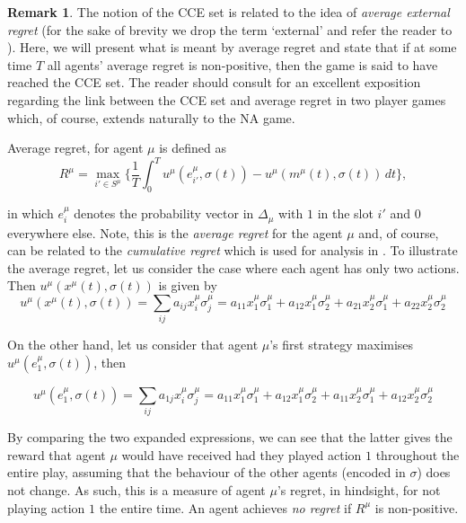 \documentclass{article}
\theoremstyle{definition}
\newtheorem*{remark}{Remark}
\newcommand{\pure}[2]{e^{#1}_{#2}}
\begin{document}
  \begin{remark}
    The notion of the CCE set is related to the idea of \emph{average external regret} (for the
    sake of brevity we drop the term `external' and refer the reader to \cite{Nisan2007}). Here, we
    will present what is meant by average regret and state that if at some time $T$ all agents'
    average regret is non-positive, then the game is said to have reached the CCE set. The
    reader should consult \cite{Ostrovski2014} for an excellent exposition regarding the
    link between the CCE set and average regret in two player games which, of course, extends
    naturally to the NA game.
    
    Average regret, for agent $\mu$ is defined as
%
    \begin{equation}
      R^{\mu} = \max_{i' \in S^\mu} \Big\{ \frac{1}{T} \int_{0}^{T} u^{\mu}(\pure{\mu}{i'}, \sigma(t)) - u^{\mu}(m^\mu(t), \sigma(t)) \, dt \Big\},
    \end{equation}
  
    in which $\pure{\mu}{i}$ denotes the probability vector in $\Delta_\mu$ with $1$ in the slot
    $i'$ and $0$ everywhere else. Note, this is the \emph{average regret} for the agent $\mu$
    and, of course, can be related to the \emph{cumulative regret} which is used for analysis
    in \cite{Leonardos2020, Cesa-Bianchi2021}.  To illustrate the average regret, let us
    consider the case where each agent has only two actions. Then $u^{\mu}(x^\mu(t), \sigma(t))$
    is given by
%    
    \begin{equation}
      u^{\mu}(x^\mu(t), \sigma(t)) = \sum_{ij} a_{ij} x_i^\mu \sigma_j^\mu = a_{11} x_1^\mu \sigma_1^\mu + a_{12} x_1^\mu \sigma_2^\mu + a_{21} x_2^\mu \sigma_1^\mu + a_{22} x_2^\mu \sigma_2^\mu
    \end{equation}
  
    On the other hand, let us consider that agent $\mu$'s first strategy maximises $u^{\mu}(\pure{\mu}{1}, \sigma(t))$, then
  
    \begin{equation}
      u^{\mu}(\pure{\mu}{1}, \sigma(t)) = \sum_{ij} a_{1j} x_i^\mu \sigma_j^\mu = a_{11} x_1^\mu \sigma_1^\mu + a_{12} x_1^\mu \sigma_2^\mu + a_{11} x_2^\mu \sigma_1^\mu + a_{12} x_2^\mu \sigma_2^\mu 
    \end{equation}
  
    By comparing the two expanded expressions, we can see that the latter gives the reward that agent $\mu$ would have received had they played action $1$ throughout the entire play, assuming that the behaviour of the other agents (encoded in $\sigma$) does not change. As such, this is a measure of agent $\mu$'s regret, in hindsight, for not playing action $1$ the entire time. An agent achieves \emph{no regret} if $R^\mu$ is non-positive.
  \end{remark}
\end{document}
